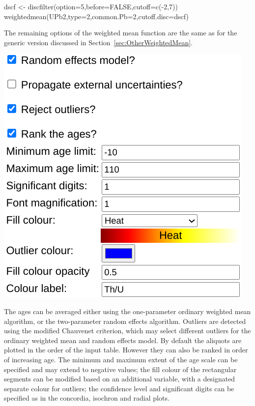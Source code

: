 \begin{refsection}
\begin{script}
dscf <- discfilter(option=5,before=FALSE,cutoff=c(-2,7))
weightedmean(UPb2,type=2,common.Pb=2,cutoff.disc=dscf)
\end{script}

The remaining options of the weighted mean function are the same as
for the generic version discussed in
Section~\ref{sec:OtherWeightedMean}.\\

\noindent\begin{minipage}[t]{.4\linewidth}
\strut\vspace*{-\baselineskip}\newline
\includegraphics[width=\linewidth]{../figures/UPbWeightedMeanOtherOptions.png}
\end{minipage}
\begin{minipage}[t]{.6\linewidth}
  The ages can be averaged either using the one-parameter ordinary
  weighted mean algorithm, or the two-parameter random effects
  algorithm.  Outliers are detected using the modified Chauvenet
  criterion, which may select different outliers for the ordinary
  weighted mean and random effects model.  By default the aliquots are
  plotted in the order of the input table. However they can also be
  ranked in order of increasing age.  The minimum and maximum extent
  of the age scale can be specified and may extend to negative values;
  the fill colour of the rectangular segments can be modified based on
  an additional variable, with a designated separate colour for
  outliers; the confidence level and significant digits can be
  specified as in the concordia, isochron and radial plots.
\end{minipage}


\end{refsection}
